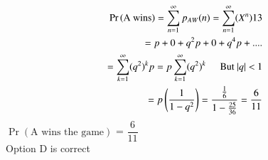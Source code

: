 \documentclass[journal,12pt,twocolumn]{IEEEtran}
\theoremstyle{definition}
\providecommand{\pr}[1]{\ensuremath{\Pr\left(#1\right)}}
\numberwithin{equation}{subsection}
\begin{document}
\onehalfspacing
\begin{align*}
    \pr{\text{A wins}} = \sum_{n=1}^{\infty} p_{AW}(n)
     = \sum_{n=1}^{\infty} (X^n){13}\\
    = p + 0 + q^2p + 0 + q^4p + ....\\
    = \sum_{k=1}^{\infty} (q^2)^k p
    = p \sum_{k=1}^{\infty} (q^2)^k \hspace{0.5cm} \text{But $|q| <$ 1}\\
    = p \left(\dfrac{1}{1 - q^2}\right)
    =\dfrac{\frac{1}{6}}{1 - \frac{25}{36}} = \dfrac{6}{11}
\end{align*}
\centering \Large
\pr{\text{A wins the game}} = $\dfrac{6}{11}$\\
Option D is correct
\end{document}
